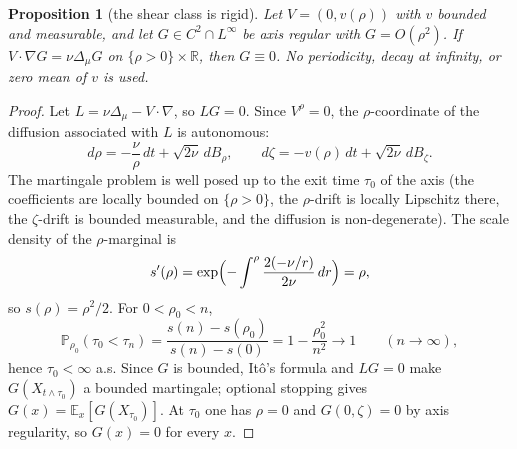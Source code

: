 \documentclass[11pt]{article}
\newtheorem{proposition}[theorem]{Proposition}
\theoremstyle{definition}
\newcommand{\R}{\mathbb{R}}
\begin{document}
\begin{proposition}[the shear class is rigid]\label{prop:shear}
Let $V=(0,v(\rho))$ with $v$ bounded and measurable, and let
$G\in C^2\cap L^\infty$ be axis regular with $G=O(\rho^2)$. If
$V\cdot\nabla G=\nu\Delta_\mu G$ on $\{\rho>0\}\times\R$, then $G\equiv0$.
No periodicity, decay at infinity, or zero mean of $v$ is used.
\end{proposition}
\begin{proof}
Let $L=\nu\Delta_\mu-V\cdot\nabla$, so $LG=0$. Since $V^\rho=0$, the
$\rho$-coordinate of the diffusion associated with $L$ is autonomous:
\begin{equation}
d\rho=-\frac{\nu}{\rho}\,dt+\sqrt{2\nu}\,dB_\rho ,
\qquad
d\zeta=-v(\rho)\,dt+\sqrt{2\nu}\,dB_\zeta .
\end{equation}
The martingale problem is well posed up to the exit time $\tau_0$ of the
axis (the coefficients are locally bounded on $\{\rho>0\}$, the $\rho$-drift
is locally Lipschitz there, the $\zeta$-drift is bounded measurable, and the
diffusion is non-degenerate). The scale density of the $\rho$-marginal is
\begin{equation}
s'(\rho)=\exp\Bigl(-\int^\rho\frac{2(-\nu/r)}{2\nu}\,dr\Bigr)=\rho ,
\end{equation}
so $s(\rho)=\rho^2/2$. For $0<\rho_0<n$,
\begin{equation}
\mathbb P_{\rho_0}(\tau_0<\tau_n)
=\frac{s(n)-s(\rho_0)}{s(n)-s(0)}
=1-\frac{\rho_0^2}{n^2}\longrightarrow1
\qquad(n\to\infty),
\end{equation}
hence $\tau_0<\infty$ a.s. Since $G$ is bounded, It\^o's formula and
$LG=0$ make $G(X_{t\wedge\tau_0})$ a bounded martingale; optional stopping
gives $G(x)=\mathbb E_x[G(X_{\tau_0})]$. At $\tau_0$ one has $\rho=0$ and
$G(0,\zeta)=0$ by axis regularity, so $G(x)=0$ for every $x$.
\end{proof}
\end{document}
